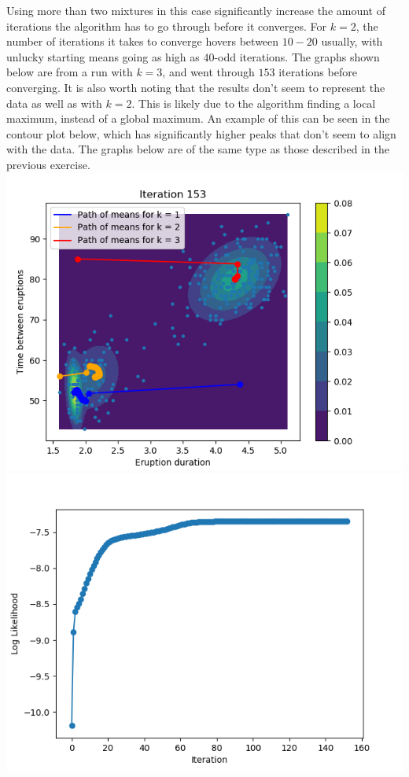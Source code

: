 Using more than two mixtures in this case significantly increase the amount of iterations the algorithm has to go through before it converges. For $k=2$, the number of iterations it takes to converge hovers between $10-20$ usually, with unlucky starting means going as high as $40$-odd iterations. The graphs shown below are from a run with $k=3$, and went through $153$ iterations before converging. It is also worth noting that the results don't seem to represent the data as well as with $k=2$. This is likely due to the algorithm finding a local maximum, instead of a global maximum. An example of this can be seen in the contour plot below, which has significantly higher peaks that don't seem to align with the data. The graphs below are of the same type as those described in the previous exercise.\\
\includegraphics[width=\linewidth]{contourk3.png}\\
\includegraphics[width=0.75\linewidth]{log_likelihoodk3.png}
